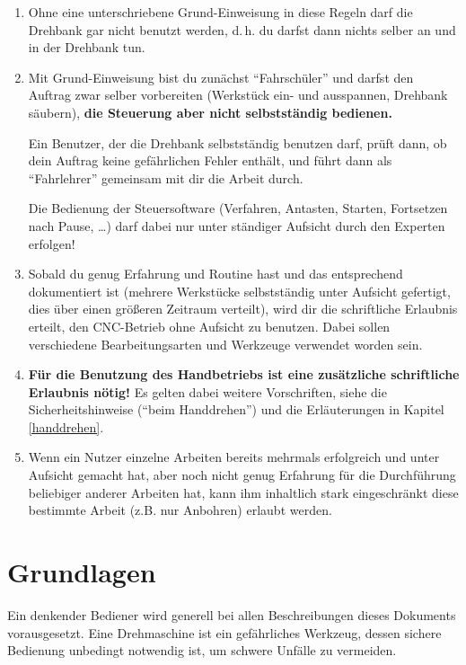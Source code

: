 \documentclass{\basedir/fablab-document}
\begin{document}
\begin{enumerate}
	\item Ohne eine unterschriebene Grund-Einweisung in diese Regeln darf die Drehbank gar nicht benutzt werden, d.\,h. du darfst dann nichts selber an und in der Drehbank tun.
	\item Mit Grund-Einweisung bist du zunächst \enquote{Fahrschüler} und darfst den Auftrag zwar selber vorbereiten (Werkstück ein- und ausspannen, Drehbank säubern), \textbf{die Steuerung aber nicht selbstständig bedienen.} 

       Ein Benutzer, der die Drehbank selbstständig benutzen darf, prüft dann, ob dein Auftrag keine gefährlichen Fehler enthält, und führt dann als \enquote{Fahrlehrer} gemeinsam mit dir die Arbeit durch.

 Die Bedienung der Steuersoftware (Verfahren, Antasten, Starten, Fortsetzen nach Pause, \dots) darf dabei nur unter ständiger Aufsicht durch den Experten erfolgen!
	\item Sobald du genug Erfahrung und Routine hast und das entsprechend dokumentiert ist (mehrere Werkstücke selbstständig unter Aufsicht gefertigt, dies über einen größeren Zeitraum verteilt), wird dir die schriftliche Erlaubnis erteilt, den CNC-Betrieb ohne Aufsicht zu benutzen. Dabei sollen verschiedene Bearbeitungsarten und Werkzeuge verwendet worden sein.
	\item  \textbf{Für die Benutzung des Handbetriebs ist eine zusätzliche schriftliche Erlaubnis nötig!} Es gelten dabei weitere Vorschriften, siehe die Sicherheitshinweise (\enquote{beim Handdrehen}) und die Erläuterungen in Kapitel \ref{handdrehen}.
	\item Wenn ein Nutzer einzelne Arbeiten bereits mehrmals erfolgreich und unter Aufsicht gemacht hat, aber noch nicht genug Erfahrung für die Durchführung beliebiger anderer Arbeiten hat, kann ihm inhaltlich stark eingeschränkt diese bestimmte Arbeit (z.B. nur Anbohren) erlaubt werden.
\end{enumerate}


\newpage
\section{Grundlagen}

Ein denkender Bediener wird generell bei allen Beschreibungen dieses Dokuments vorausgesetzt. Eine Drehmaschine ist ein gefährliches Werkzeug, dessen sichere Bedienung unbedingt notwendig ist, um schwere Unfälle zu vermeiden.
\end{document}
